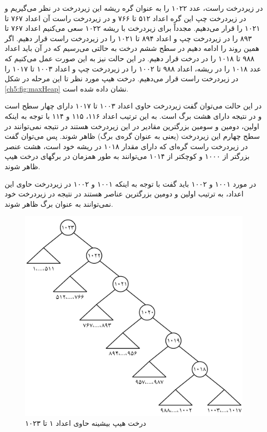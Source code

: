 در زیردرخت راست، عدد ۱۰۲۲ را به عنوان گره ریشه این زیردرخت در نظر می‌گیریم  و در زیردرخت چپ این گره اعداد ۵۱۲ تا ۷۶۶ و در زیردرخت راست آن اعداد ۷۶۷ تا ۱۰۲۱ را قرار می‌دهیم. مجدداً برای زیردرخت با ریشه ۱۰۲۲ سعی می‌کنیم اعداد ۷۶۷ تا ۸۹۳ را در زیردرخت چپ و اعداد ۸۹۴ تا ۱۰۲۱ را در زیردرخت راست قرار دهیم.  اگر همین روند را ادامه دهیم در سطح ششم درخت به حالتی می‌رسیم که در آن باید اعداد ۹۸۸ تا ۱۰۱۸ را در درخت قرار دهیم. در این حالت نیز به این صورت عمل می‌کنیم که عدد ۱۰۱۸ را در ریشه، اعداد ۹۸۸ تا ۱۰۰۲ را در زیردرخت چپ و اعداد ۱۰۰۳ تا ۱۰۱۷ را در زیردرخت راست قرار می‌دهیم. درخت هیپ مورد نظر تا این مرحله در شکل {\eqref{ch5:fig:maxHeap}} نشان داده شده است.

در این حالت می‌توان گفت زیردرخت حاوی اعداد ۱۰۰۳ تا ۱۰۱۷ دارای چهار سطح است و در نتیجه دارای هشت برگ است. به این ترتیب اعداد ۱۱۶، ۱۱۵ و ۱۱۴ با توجه به اینکه اولین، دومین و سومین بزرگترین مقادیر در این زیردرخت هستند در نتیجه نمی‌توانند در سطح چهارم این زیردرخت (یعنی به عنوان گره‌ی برگ) ظاهر شوند. پس می‌توان گفت در زیردرخت راست گره‌ای که دارای مقدار ۱۰۱۸ در ریشه خود است، هشت عنصر بزرگتر از ۱۰۰۰ و کوچکتر از ۱۰۱۴ می‌توانند به طور همزمان در برگهای درخت هیپ ظاهر شوند. 

در مورد ۱۰۰۱ و ۱۰۰۲ باید گفت با توجه به اینکه ۱۰۰۱ و ۱۰۰۲ در زیردرخت حاوی این اعداد، به ترتیب اولین و دومین بزرگترین عناصر هستند در نتیجه در زیردرخت خود نمی‌توانند به عنوان برگ ظاهر شوند. 
\begin{figure}
\begin{center}
\includegraphics[scale=0.33]{figs/ch5/max_heap.pdf}
\caption{درخت هیپ بیشینه حاوی اعداد ۱ تا ۱۰۲۳}\label{ch5:fig:maxHeap}
\end{center}
\end{figure}

